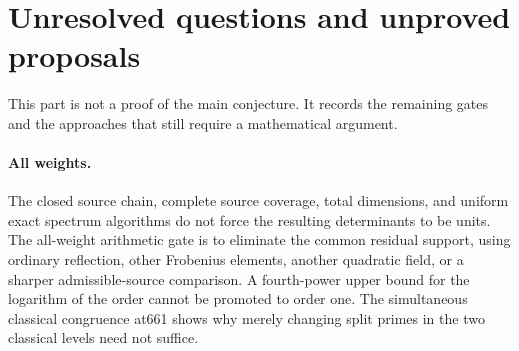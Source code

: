 \section{Unresolved questions and unproved proposals}

This part is not a proof of the main conjecture. It records the
remaining gates and the approaches that still require a
mathematical argument.

\paragraph{All weights.}
The closed source chain, complete source coverage, total
dimensions, and uniform exact spectrum algorithms do not
force the resulting determinants to be units. The all-weight
arithmetic gate is to eliminate the common residual support,
using ordinary reflection, other Frobenius elements, another
quadratic field, or a sharper admissible-source comparison.
A fourth-power upper bound for the logarithm of the order
cannot be promoted to order one. The simultaneous classical
congruence at661 shows why merely changing split primes in
the two classical levels need not suffice.

